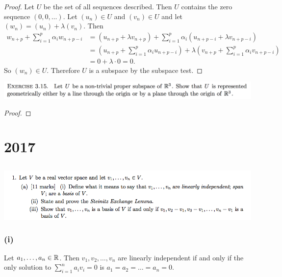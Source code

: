 \documentclass[12pt]{article}
\begin{document}
\begin{proof}
  Let $U$ be the set of all sequences described. Then $U$ contains the zero
  sequence $(0, 0, \ldots)$. Let $(u_n) \in U$ and $(v_n) \in U$ and let
  $(w_n) = (u_n) + \lambda(v_n)$. Then
  \begin{align*}
        w_{n+p}                    + \sum_{i=1}^{p} \alpha_i w_{n+p-i}
    &= (u_{n+p} + \lambda v_{n+p}) + \sum_{i=1}^{p} \alpha_i (u_{n+p-i} + \lambda v_{n+p-i})\\
      &= (u_{n+p} + \sum_{i=1}^{p} \alpha_i u_{n+p-i}) +
        \lambda (v_{n+p} + \sum_{i=1}^{p} \alpha_i v_{n+p-i})\\
      &= 0 + \lambda \cdot 0 = 0.
  \end{align*}
  So $(w_n) \in U$. Therefore $U$ is a subspace by the subspace test.
\end{proof}

\begin{mdframed}
\includegraphics[width=400pt]{img/oxford-prelims-M1-linear-algebra-3-15.png}
\end{mdframed}

\begin{proof}

\end{proof}


\section{2017}

\subsection*{}  %
\begin{mdframed}
\includegraphics[width=400pt]{img/oxford-prelims-2017-A-1-1.png}
\end{mdframed}

\subsubsection*{(i)}
\begin{definition*}
  Let $a_1, \ldots, a_n \in \mathbb{R}$. Then $v_1, v_2, \ldots, v_n$ are linearly
  independent if and only if the only solution to $\sum_{i=1}^n a_iv_i = 0$ is
  $a_1 = a_2 = \ldots = a_n = 0$.
\end{definition*}
\end{document}

